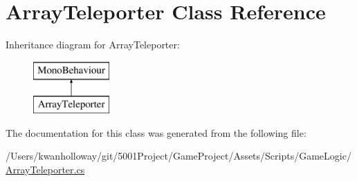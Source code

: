 \hypertarget{class_array_teleporter}{}\section{Array\+Teleporter Class Reference}
\label{class_array_teleporter}
Inheritance diagram for Array\+Teleporter\+:\begin{figure}[H]
\begin{center}
\leavevmode
\includegraphics[height=2.000000cm]{class_array_teleporter}
\end{center}
\end{figure}


The documentation for this class was generated from the following file\+:\begin{DoxyCompactItemize}
\item 
/\+Users/kwanholloway/git/5001\+Project/\+Game\+Project/\+Assets/\+Scripts/\+Game\+Logic/\hyperlink{_array_teleporter_8cs}{Array\+Teleporter.\+cs}\end{DoxyCompactItemize}
